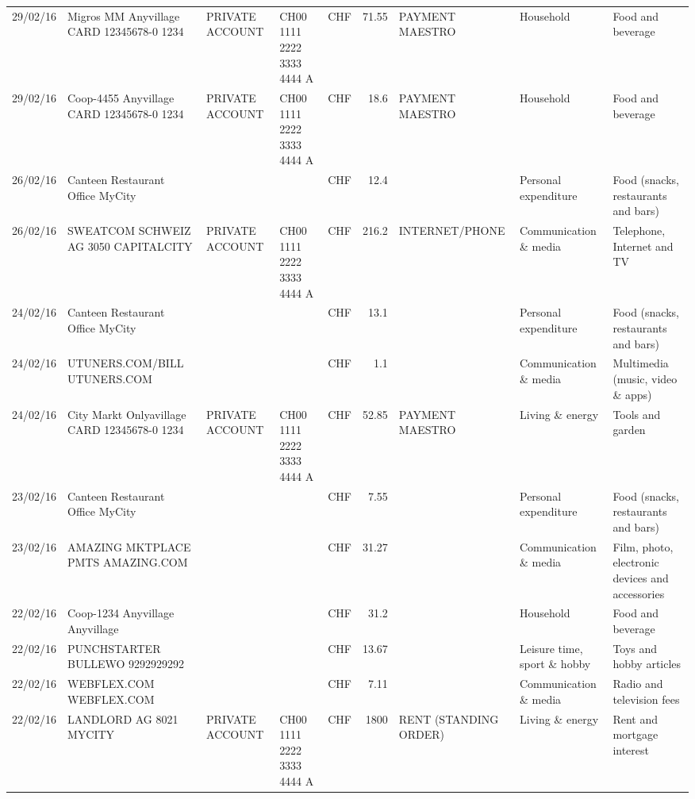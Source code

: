 \begin{landscape}
\begin{table}[h]
\begin{center}
\begin{tabular}{rllllrlll}
		29/02/16 & Migros MM Anyvillage CARD 12345678-0 1234 & PRIVATE ACCOUNT & CH00 1111 2222 3333 4444 A & CHF   & 71.55 & PAYMENT MAESTRO & Household & Food and beverage \\
		29/02/16 & Coop-4455 Anyvillage CARD 12345678-0 1234 & PRIVATE ACCOUNT & CH00 1111 2222 3333 4444 A & CHF   & 18.6  & PAYMENT MAESTRO & Household & Food and beverage \\
		26/02/16 & Canteen Restaurant Office      MyCity &       &       & CHF   & 12.4  &       & Personal expenditure & Food (snacks, restaurants and bars) \\
		26/02/16 & SWEATCOM SCHWEIZ AG 3050 CAPITALCITY & PRIVATE ACCOUNT & CH00 1111 2222 3333 4444 A & CHF   & 216.2 & INTERNET/PHONE & Communication \& media & Telephone,  Internet and TV \\
		24/02/16 & Canteen Restaurant Office      MyCity &       &       & CHF   & 13.1  &       & Personal expenditure & Food (snacks, restaurants and bars) \\
		24/02/16 & UTUNERS.COM/BILL          UTUNERS.COM &       &       & CHF   & 1.1   &       & Communication \& media & Multimedia (music, video \& apps) \\
		24/02/16 & City Markt Onlyavillage CARD 12345678-0 1234 & PRIVATE ACCOUNT & CH00 1111 2222 3333 4444 A & CHF   & 52.85 & PAYMENT MAESTRO & Living \& energy & Tools and garden \\
		23/02/16 & Canteen Restaurant Office      MyCity &       &       & CHF   & 7.55  &       & Personal expenditure & Food (snacks, restaurants and bars) \\
		23/02/16 & AMAZING MKTPLACE PMTS     AMAZING.COM &       &       & CHF   & 31.27 &       & Communication \& media & Film, photo, electronic devices and accessories \\
		22/02/16 & Coop-1234 Anyvillage    Anyvillage &       &       & CHF   & 31.2  &       & Household & Food and beverage \\
		22/02/16 & PUNCHSTARTER BULLEWO   9292929292 &       &       & CHF   & 13.67 &       & Leisure time, sport \& hobby & Toys and hobby articles \\
		22/02/16 & WEBFLEX.COM              WEBFLEX.COM &       &       & CHF   & 7.11  &       & Communication \& media & Radio and television fees \\
		22/02/16 & LANDLORD AG 8021 MYCITY & PRIVATE ACCOUNT & CH00 1111 2222 3333 4444 A & CHF   & 1800  & RENT (STANDING ORDER) & Living \& energy & Rent and mortgage interest \\

\end{tabular}
\end{center}
\end{table}
\end{landscape}
